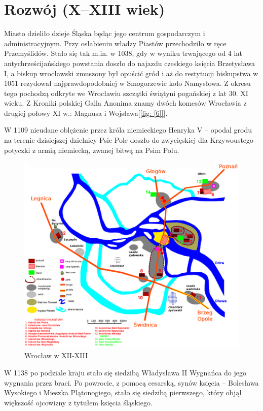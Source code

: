 \documentclass{article}
\begin{document}
\section {Rozwój (X–XIII wiek)}
Miasto dzieliło dzieje Śląska będąc jego centrum gospodarczym i administracyjnym. Przy osłabieniu władzy Piastów przechodziło w ręce Przemyślidów. Stało się tak m.in. w 1038, gdy w wyniku trwającego od 4 lat antychrześcijańskiego powstania doszło do najazdu czeskiego księcia Brzetysława I, a biskup wrocławski zmuszony był opuścić gród i aż do restytucji biskupstwa w 1051 rezydował najprawdopodobniej w Smogorzewie koło Namysłowa. Z okresu tego pochodzą odkryte we Wrocławiu szczątki świątyni pogańskiej z lat 30. XI wieku. Z Kroniki polskiej Galla Anonima znamy dwóch komesów Wrocławia z drugiej połowy XI w.: Magnusa i Wojsława[\ref{fig: [6]}].


W 1109 nieudane oblężenie przez króla niemieckiego Henryka V – opodal grodu na terenie dzisiejszej dzielnicy Psie Pole doszło do zwycięskiej dla Krzywoustego potyczki z armią niemiecką, zwanej bitwą na Psim Polu.

\begin{figure}[h]
	\centering
	\includegraphics[scale=0.6]{Wrocław XII-XIII.png}
	\caption{Wrocław w XII-XIII}
	\label{fig: Wrocław w XII-XIII}
\end{figure}


W 1138 po podziale kraju stało się siedzibą Władysława II Wygnańca do jego wygnania przez braci. Po powrocie, z pomocą cesarską, synów księcia – Bolesława Wysokiego i Mieszka Plątonogiego, stało się siedzibą pierwszego, który objął większość ojcowizny z tytułem księcia śląskiego.
\end{document}
